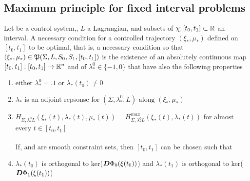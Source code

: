 \subsection{Maximum principle for fixed interval problems}
Let \controlSystem be a control system,, $L$ a Lagrangian, \sz and \so subsets of $\chi;[t_0,t_1]\subset\mathbb{R}$ an interval.
A necessary condition for a controlled trajectory $(\xi_*,\mu_*)$ defined on $[t_0,t_1]$  to be optimal, that is, a necessary condition so that $(\xi_*,\mu_*)\in\mathfrak{P}(\Sigma,L,S_0,S_1,[t_0,t_1])$ is the existence of an absolutely continuous map $[t_0,t_1]:[t_0,t_1]\rightarrow\mathbb{R}^n$ and of  $\lambda_*^0\in\{-1,0\}$ that have also the following properties
\begin{enumerate}
	\item either $\lambda_*^0=.1$ or $\lambda_*(t_0)\ne0$
	\item $\lambda_*$ is an adjoint repsonse for $(\Sigma,\lambda_*^0,L)\text{ along }(\xi_*,\mu_*)$
	\item $H_{\Sigma,\lambda_*^0L}(\xi_*(t),\lambda_*(t),\mu_*(t))=H_{\Sigma,\lambda_*^0L}^{max}(\xi_*(t),\lambda_*(t))$ for almost every $t\in[t_0,t_1]$\\\\
	If, \so and \sz are smooth constraint sets, then $[t_0,t_1]$ can be chosen such that 
	\item $\lambda_*(t_0)$ is orthogonal to ker($\boldsymbol{D}\Phi_0(\xi(t_0))$) and $\lambda_*(t_1)$ is orthogonal to ker($\boldsymbol{D}\Phi_1(\xi(t_1))$)
\end{enumerate}

